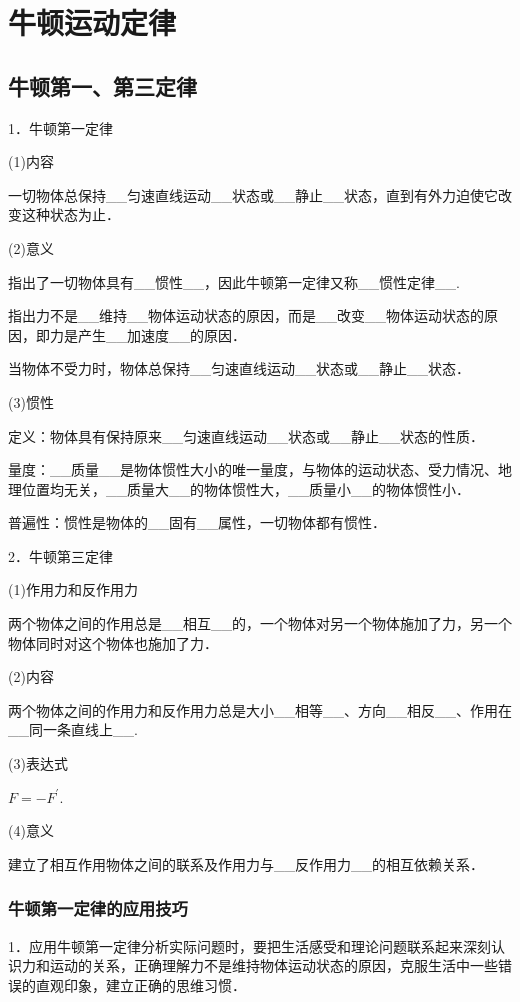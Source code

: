 \chapter{牛顿运动定律}
\section{牛顿第一、第三定律}


1．牛顿第一定律

(1)内容

一切物体总保持\_\_匀速直线运动\_\_状态或\_\_静止\_\_状态，直到有外力迫使它改变这种状态为止．

(2)意义

指出了一切物体具有\_\_惯性\_\_，因此牛顿第一定律又称\_\_惯性定律\_\_.

指出力不是\_\_维持\_\_物体运动状态的原因，而是\_\_改变\_\_物体运动状态的原因，即力是产生\_\_加速度\_\_的原因．

当物体不受力时，物体总保持\_\_匀速直线运动\_\_状态或\_\_静止\_\_状态．

(3)惯性

定义：物体具有保持原来\_\_匀速直线运动\_\_状态或\_\_静止\_\_状态的性质．

量度：\_\_质量\_\_是物体惯性大小的唯一量度，与物体的运动状态、受力情况、地理位置均无关，\_\_质量大\_\_的物体惯性大，\_\_质量小\_\_的物体惯性小．

普遍性：惯性是物体的\_\_固有\_\_属性，一切物体都有惯性．

2．牛顿第三定律

(1)作用力和反作用力

两个物体之间的作用总是\_\_相互\_\_的，一个物体对另一个物体施加了力，另一个物体同时对这个物体也施加了力．

(2)内容

两个物体之间的作用力和反作用力总是大小\_\_相等\_\_、方向\_\_相反\_\_、作用在\_\_同一条直线上\_\_.

(3)表达式

$F=-F^{\prime}$.

(4)意义

建立了相互作用物体之间的联系及作用力与\_\_反作用力\_\_的相互依赖关系．

\newpage
\subsection{牛顿第一定律的应用技巧}

1．应用牛顿第一定律分析实际问题时，要把生活感受和理论问题联系起来深刻认识力和运动的关系，正确理解力不是维持物体运动状态的原因，克服生活中一些错误的直观印象，建立正确的思维习惯．


